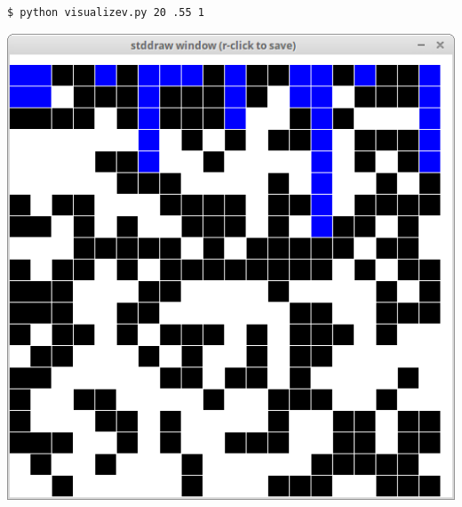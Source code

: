 \documentclass[8pt,a4paper,compress,handout]{beamer}
\begin{document}
\begin{frame}[fragile]
\begin{minipage}{160pt}
\begin{lstlisting}[language={}]
$ python visualizev.py 20 .55 1
\end{lstlisting}
\end{minipage}%
\begin{minipage}{140pt}
\hfill \includegraphics[scale=0.15]{figures/percolation9.png}
\end{minipage}
\end{frame}
\end{document}
